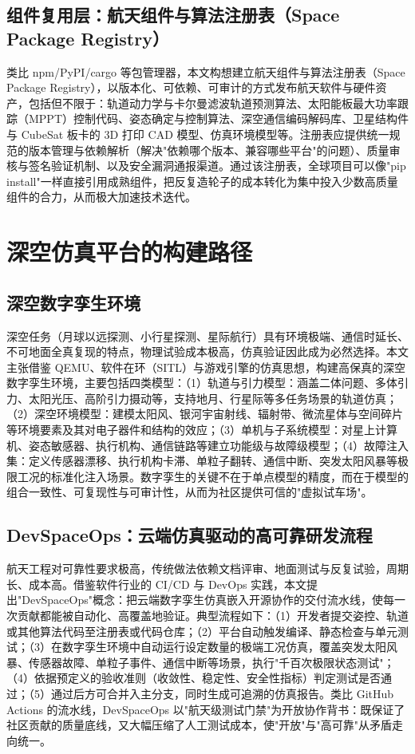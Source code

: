 \documentclass[UTF8,a4paper,zihao=-4]{ctexart}
\begin{document}
\subsection{组件复用层：航天组件与算法注册表（Space Package Registry）}
类比 npm/PyPI/cargo 等包管理器，本文构想建立航天组件与算法注册表（Space Package Registry），以版本化、可依赖、可审计的方式发布航天软件与硬件资产，包括但不限于：轨道动力学与卡尔曼滤波轨道预测算法、太阳能板最大功率跟踪（MPPT）控制代码、姿态确定与控制算法、深空通信编码解码库、卫星结构件与 CubeSat 板卡的 3D 打印 CAD 模型、仿真环境模型等。注册表应提供统一规范的版本管理与依赖解析（解决"依赖哪个版本、兼容哪些平台"的问题）、质量审核与签名验证机制、以及安全漏洞通报渠道。通过该注册表，全球项目可以像"pip install"一样直接引用成熟组件，把反复造轮子的成本转化为集中投入少数高质量组件的合力，从而极大加速技术迭代。

\section{深空仿真平台的构建路径}
\subsection{深空数字孪生环境}
深空任务（月球以远探测、小行星探测、星际航行）具有环境极端、通信时延长、不可地面全真复现的特点，物理试验成本极高，仿真验证因此成为必然选择。本文主张借鉴 QEMU、软件在环（SITL）与游戏引擎的仿真思想，构建高保真的深空数字孪生环境，主要包括四类模型：（1）轨道与引力模型：涵盖二体问题、多体引力、太阳光压、高阶引力摄动等，支持地月、行星际等多任务场景的轨道仿真；（2）深空环境模型：建模太阳风、银河宇宙射线、辐射带、微流星体与空间碎片等环境要素及其对电子器件和结构的效应；（3）单机与子系统模型：对星上计算机、姿态敏感器、执行机构、通信链路等建立功能级与故障级模型；（4）故障注入集：定义传感器漂移、执行机构卡滞、单粒子翻转、通信中断、突发太阳风暴等极限工况的标准化注入场景。数字孪生的关键不在于单点模型的精度，而在于模型的组合一致性、可复现性与可审计性，从而为社区提供可信的"虚拟试车场"。

\subsection{DevSpaceOps：云端仿真驱动的高可靠研发流程}
航天工程对可靠性要求极高，传统做法依赖文档评审、地面测试与反复试验，周期长、成本高。借鉴软件行业的 CI/CD 与 DevOps 实践\cite{devops2016}，本文提出"DevSpaceOps"概念：把云端数字孪生仿真嵌入开源协作的交付流水线，使每一次贡献都能被自动化、高覆盖地验证。典型流程如下：（1）开发者提交姿控、轨道或其他算法代码至注册表或代码仓库；（2）平台自动触发编译、静态检查与单元测试；（3）在数字孪生环境中自动运行设定数量的极端工况仿真，覆盖突发太阳风暴、传感器故障、单粒子事件、通信中断等场景，执行"千百次极限状态测试"；（4）依据预定义的验收准则（收敛性、稳定性、安全性指标）判定测试是否通过；（5）通过后方可合并入主分支，同时生成可追溯的仿真报告。类比 GitHub Actions 的流水线，DevSpaceOps 以"航天级测试门禁"为开放协作背书：既保证了社区贡献的质量底线，又大幅压缩了人工测试成本，使"开放"与"高可靠"从矛盾走向统一。
\end{document}
